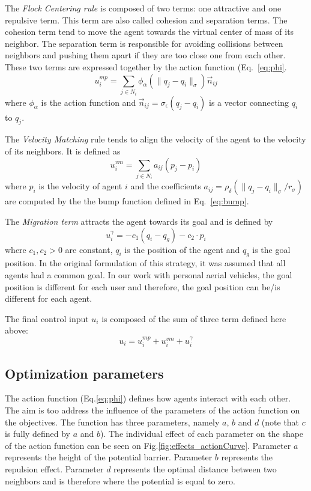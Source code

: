 The \emph{Flock Centering rule} is composed of two terms: one attractive and one repulsive term. This term are also called cohesion and separation terms. The cohesion term tend to move the agent towards the virtual center of mass of its neighbor. The separation term is responsible for avoiding collisions between neighbors and pushing them apart if they are too close one from each other.  These two terms are expressed together by the action function (Eq.~\ref{eq:phi}.
\begin{equation}
u_i^{mp}=\sum_{j\in N_i}{\phi_{\alpha}(\|q_j-q_i\|_{\sigma})}\vec{n}_{ij}
\label{eq:motionplanning}
\end{equation}
where $\phi_{\alpha}$ is the action function and $\vec{n}_{ij}=\sigma_{\epsilon}(q_j-q_i)$ is a vector connecting $q_i$ to $q_j$. 

The \emph{Velocity Matching} rule tends to align the velocity of the agent to the velocity of its neighbors. It is defined as 
\begin{equation}
u_i^{vm}=\sum_{j\in N_i}{a_{ij}(p_j-p_i)}
\label{eq:velocitymatching}
\end{equation}
where $p_i$ is the velocity of agent $i$ and the coefficients $a_{ij}=\rho_{\delta}(\|q_j-q_i\|_{\sigma}/r_{\sigma})$ are computed by the the bump function defined in Eq.~\ref{eq:bump}.


The \emph{Migration term} attracts the agent towards its goal and is defined by
\begin{equation}
u_i^{\gamma}=-c_1(q_i-q_g)-c_2\cdot p_i
\label{eq:migration}
\end{equation}  
where $c_1,c_2>0$ are constant, $q_i$ is the position of the agent and $q_g$ is the goal position. In the original formulation of this strategy, it was assumed that all agents had a common goal. In our work with personal aerial vehicles, the goal position is different for each user and therefore, the goal position can be/is different for each agent. 

The final control input $u_i$ is composed of the sum of three term defined here above:
\begin{equation}
u_i=u_i^{mp}+u_i^{vm}+u_i^{\gamma}
\label{eq:input}
\end{equation}

\subsection{Optimization parameters}

The action function (Eq.\ref{eq:phi}) defines how agents interact with each other. The aim is too address the influence of the parameters of the action function on the objectives. The function has three parameters, namely $a$, $b$ and $d$ (note that $c$ is fully defined by $a$ and $b$). The individual effect of each parameter on the shape of the action function can be seen on Fig.\ref{fig:effects_actionCurve}. Parameter $a$ represents the height of the potential barrier. Parameter $b$ represents the repulsion effect. Parameter $d$ represents the optimal distance between two neighbors and is therefore where the potential is equal to zero. 

